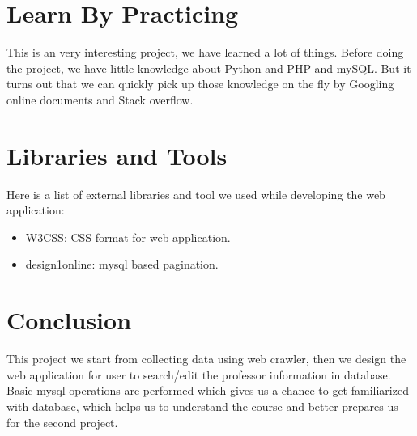 \documentclass[authoryear,preprint,final,12pt]{elsarticle}
\begin{document}
\section{Learn By Practicing}
This is an very interesting project, we have learned a lot of things. Before doing the project, we have little knowledge about Python and PHP and mySQL. But it turns out that we can quickly pick up those knowledge on the fly by Googling online documents and Stack overflow.

\section{Libraries and Tools}
Here is a list of external libraries and tool we used while developing the web application:
\begin{itemize}
    \item W3CSS\cite{w3css}: CSS format for web application.
    \item design1online\cite{design1onlinecom}: mysql based pagination. 
\end{itemize}
\section{Conclusion}
This project we start from collecting data using web crawler, then we design the web application for user to search/edit the professor information in database. Basic mysql operations are performed which gives us a chance to get familiarized with database, which helps us to understand the course and better prepares us for the second project.











\end{document}
